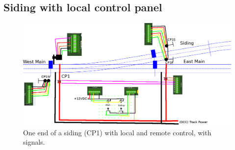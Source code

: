 %
%
%
%
% 
%
%
%
%
%
% 
%

\subsection{Siding with local control panel}
\label{sect-appl:siding}
\begin{figure}[hbpt]\begin{centering}%
\includegraphics[width=5in]{ExampleSidingCP1-Wiring.png}
\caption{One end of a siding (CP1) with local and remote control, with 
signals.}
\label{fig:ExampleSidingCP1-Wiring}
\end{centering}\end{figure}

